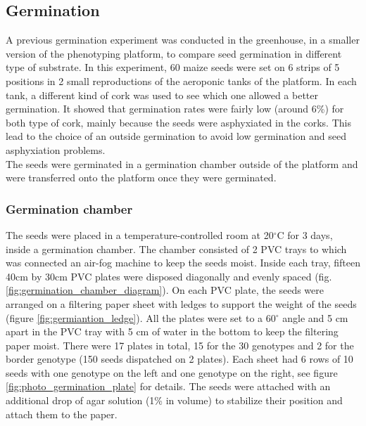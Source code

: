 \subsection{Germination}
A previous germination experiment was conducted in the greenhouse, in a smaller version of the phenotyping platform, to compare seed germination in different type of substrate. In this experiment, 60 maize seeds were set on 6 strips of 5 positions in 2 small reproductions of the aeroponic tanks of the platform. In each tank, a different kind of cork was used to see which one allowed a better germination. It showed that germination rates were fairly low (around 6\%) for both type of cork, mainly because the seeds were asphyxiated in the corks. This lead to the choice of an outside germination to avoid low germination and seed asphyxiation problems.\\
The seeds were germinated in a germination chamber outside of the platform and were transferred onto the platform once they were germinated.
\subsubsection{Germination chamber}
The seeds were placed in a temperature-controlled room at 20$^{\circ}$C for 3 days, inside a germination chamber. The chamber consisted of 2 PVC trays to which was connected an air-fog machine to keep the seeds moist. Inside each tray, fifteen 40cm by 30cm PVC plates were disposed diagonally and evenly spaced  (fig. \ref{fig:germination_chamber_diagram}). On each PVC plate, the seeds were arranged on a filtering paper sheet with ledges to support the weight of the seeds (figure \ref{fig:germiantion_ledge}). All the plates were set to a 60$^{\circ}$ angle and 5 cm apart in the PVC tray with 5 cm of water in the bottom to keep the filtering paper moist. There were 17 plates in total, 15 for the 30 genotypes and 2 for the border genotype (150 seeds dispatched on 2 plates). Each sheet had 6 rows of 10 seeds with one genotype on the left and one genotype on the right, see figure \ref{fig:photo_germination_plate} for details. The seeds were attached with an additional drop of agar solution (1\% in volume) to stabilize their position and attach them to the paper.

